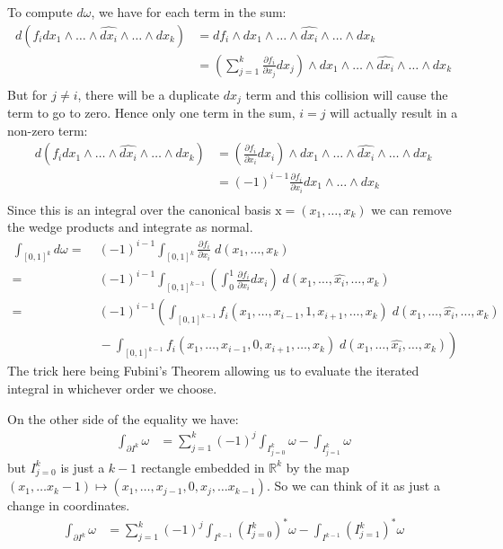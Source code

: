 To compute $d\omega$, we have for each term in the sum:
\begin{align*}
	d \left( f_i dx_1 \wedge \ldots \wedge \widehat{dx_i} \wedge  \ldots \wedge dx_k \right) 
 		&= df_i \wedge dx_1 \wedge \ldots \wedge \widehat{dx_i} \wedge  \ldots \wedge dx_k \\ 
 		&= \left( \sum_{j=1}^k \frac{\partial f_i}{\partial x_j} dx_j \right)
 			\wedge dx_1 \wedge \ldots \wedge \widehat{dx_i} \wedge  \ldots \wedge dx_k \\ 
\end{align*}
But for $j \neq i$, there will be a duplicate $dx_j$ term and this collision will cause the term to go to zero.
Hence only one term in the sum, $i=j$ will actually result in a non-zero term:
\begin{align*}
	d \left( f_i dx_1 \wedge \ldots \wedge \widehat{dx_i} \wedge  \ldots \wedge dx_k \right) 
 		&= \left(\frac{\partial f_i}{\partial x_i} dx_i \right)
 			\wedge dx_1 \wedge \ldots \wedge \hat{dx_i} \wedge  \ldots \wedge dx_k \\ 
		&= (-1)^{i-1} \frac{\partial f_i}{\partial x_i}
 			 dx_1 \wedge \ldots \wedge dx_k \\ 
\end{align*}
Since this is an integral over the canonical basis $\text{x} = (x_1, \ldots, x_k)$ we can remove the wedge products and
integrate as normal.
\begin{align*}
	\int_{[0,1]^k} d\omega
		=&\; (-1)^{i-1} \int_{[0,1]^k} \frac{\partial f_i}{\partial x_i}\; d(x_1, \ldots, x_k) \\
		=&\; (-1)^{i-1} \int_{[0,1]^{k-1}} \left( \int_0^1 \frac{\partial f_i}{\partial x_i} dx_i \right) 
			\;d(x_1, \ldots, \widehat{x_i}, \ldots, x_k)\\
		=&\; (-1)^{i-1}\left( \int_{[0,1]^{k-1}} f_i(x_1, \ldots, x_{i-1}, 1, x_{i+1}, \ldots, x_k)
			\;d(x_1, \ldots, \widehat{x_i}, \ldots, x_k) \right.\\
		&\;	- \left. \int_{[0,1]^{k-1}} f_i(x_1, \ldots, x_{i-1}, 0, x_{i+1}, \ldots, x_k)
			\;d(x_1, \ldots, \widehat{x_i}, \ldots, x_k) \right)
\end{align*}
The trick here being Fubini's Theorem allowing us to evaluate the iterated integral in whichever order we choose.


On the other side of the equality we have:
\begin{align*}
	\int_{\partial I^k} \omega 
		&= \sum_{j=1}^k (-1)^j \int_{I^k_{j=0}} \omega - \int_{I^k_{j=1}} \omega
\end{align*}
but $I^k_{j=0}$ is just a $k-1$ rectangle embedded in $\mathbb{R}^k$ by the map 
$(x_1, \ldots x_k-1) \mapsto (x_1, \ldots, x_{j-1}, 0, x_{j}, \ldots x_{k-1})$.
So we can think of it as just a change in coordinates.
\begin{align*}
	\int_{\partial I^k} \omega 
		&= \sum_{j=1}^k (-1)^j \int_{I^{k-1}} (I^k_{j=0})^*\omega - \int_{I^{k-1}} (I^k_{j=1})^*\omega
\end{align*}

